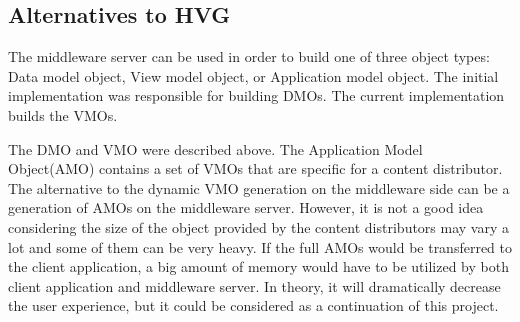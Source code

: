 \subsection{Alternatives to HVG}

The middleware server can be used in order to build one of three object types: Data model object, View model object, or Application model object. The initial implementation was responsible for building DMOs. The current implementation builds the VMOs.

The DMO and VMO were described above. The Application Model Object(AMO) contains a set of VMOs that are specific for a content distributor. The alternative to the dynamic VMO generation on the middleware side can be a generation of AMOs on the middleware server. However, it is not a good idea considering the size of the object provided by the content distributors may vary a lot and some of them can be very heavy. If the full AMOs would be transferred to the client application, a big amount of memory would have to be utilized by both client application and middleware server. In theory, it will dramatically decrease the user experience, but it could be considered as a continuation of this project.


\newpage